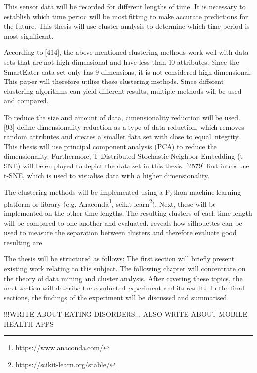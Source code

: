 This sensor data will be recorded for different lengths of time. It is necessary to establish which time period will be most fitting to make accurate predictions for the future. This thesis will use cluster analysis to determine which time period is most significant.

According to \textcite{han2011data}[414], the above-mentioned clustering methods work well with data sets that are not high-dimensional and have less than 10 attributes. Since the SmartEater data set only has 9 dimensions, it is not considered high-dimensional. This paper will therefore utilise these clustering methods. Since different clustering algorithms can yield different results, multiple methods will be used and compared.

To reduce the size and amount of data, dimensionality reduction will be used. \textcite{han2011data}[93] define dimensionality reduction as a type of data reduction, which removes random attributes and creates a smaller data set with close to equal integrity. This thesis will use principal component analysis (PCA) to reduce the dimensionality.
Furthermore, T-Distributed Stochastic Neighbor Embedding (t-SNE) will be employed to depict the data set in this thesis. \textcite{maaten2008visualizing}[2579] first introduce t-SNE, which is used to visualise data with a higher dimensionality. 

The clustering methods will be implemented using a Python machine learning platform or library (e.g. Anaconda\footnote{\url{https://www.anaconda.com/}}, scikit-learn\footnote{\url{https://scikit-learn.org/stable/}}). Next, these will be implemented on the other time lengths. The resulting clusters of each time length will be compared to one another and evaluated. 
\textcite{rousseeuw1987silhouettes} reveals how silhouettes can be used to measure the separation between clusters and therefore evaluate good resulting are.



The thesis will be structured as follows: The first section will briefly present existing work relating to this subject. The following chapter will concentrate on the theory of data mining and cluster analysis. After covering these topics, the next section will describe the conducted experiment and its results. In the final sections, the findings of the experiment will be discussed and summarised. 


!!!WRITE ABOUT EATING DISORDERS.., ALSO WRITE ABOUT MOBILE HEALTH APPS
